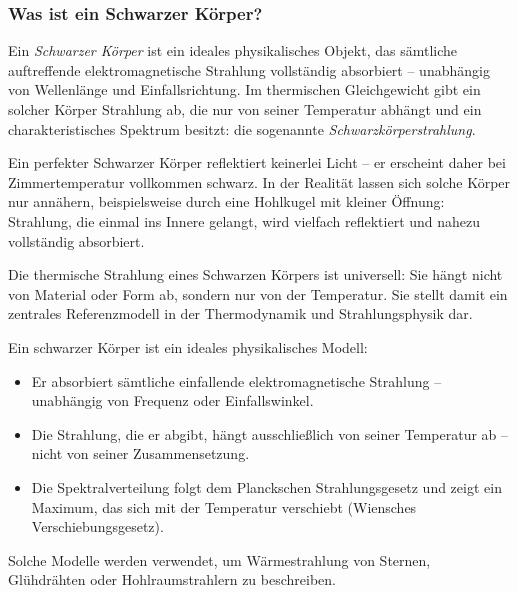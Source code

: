 \subsubsection{Was ist ein Schwarzer Körper?}

Ein \emph{Schwarzer Körper} ist ein ideales physikalisches Objekt, das sämtliche auftreffende elektromagnetische Strahlung vollständig absorbiert – unabhängig von Wellenlänge und Einfallsrichtung. Im thermischen Gleichgewicht gibt ein solcher Körper Strahlung ab, die nur von seiner Temperatur abhängt und ein charakteristisches Spektrum besitzt: die sogenannte \emph{Schwarzkörperstrahlung}.

Ein perfekter Schwarzer Körper reflektiert keinerlei Licht – er erscheint daher bei Zimmertemperatur vollkommen schwarz. In der Realität lassen sich solche Körper nur annähern, beispielsweise durch eine Hohlkugel mit kleiner Öffnung: Strahlung, die einmal ins Innere gelangt, wird vielfach reflektiert und nahezu vollständig absorbiert.

Die thermische Strahlung eines Schwarzen Körpers ist universell: Sie hängt nicht von Material oder Form ab, sondern nur von der Temperatur. Sie stellt damit ein zentrales Referenzmodell in der Thermodynamik und Strahlungsphysik dar.
\newpage
\noindent
\vspace{1em}
\begin{tcolorbox}[colback=blue!5!white, colframe=blue!50!black, title=Was ist ein schwarzer Körper?]
	\label{box:schwarzerkoerper}
	Ein schwarzer Körper ist ein ideales physikalisches Modell:
	
	\begin{itemize}
		\item Er absorbiert sämtliche einfallende elektromagnetische Strahlung – unabhängig von Frequenz oder Einfallswinkel.
		\item Die Strahlung, die er abgibt, hängt ausschließlich von seiner Temperatur ab – nicht von seiner Zusammensetzung.
		\item Die Spektralverteilung folgt dem Planckschen Strahlungsgesetz und zeigt ein Maximum, das sich mit der Temperatur verschiebt (Wiensches Verschiebungsgesetz).
	\end{itemize}
	
	Solche Modelle werden verwendet, um Wärmestrahlung von Sternen, Glühdrähten oder Hohlraumstrahlern zu beschreiben.
\end{tcolorbox}


